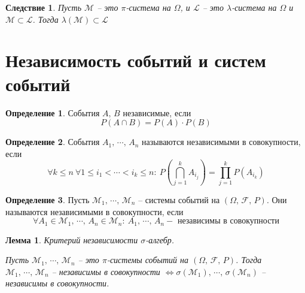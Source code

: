 \documentclass[a4paper,12pt]{article}
\renewcommand{\leq}{\ensuremath{\leqslant}}
\theoremstyle{plain}
\newtheorem{lemma}{Лемма}[section]
\newtheorem*{corollary}{Следствие}
\theoremstyle{definition}
\newtheorem{definition}{Определение}[section]
\theoremstyle{remark}
\begin{document}
\begin{corollary}
	Пусть $\mathcal{M}$ -- это $\pi$-система на $\Omega$, и $\mathcal{L}$ -- это $\lambda$-система на $\Omega$ и $\mathcal{M} \subset \mathcal{L}$. Тогда $\lambda(\mathcal{M}) \subset \mathcal{L}$
\end{corollary}

\section{Независимость событий и систем событий}
\begin{definition}
	События $A,\, B$ независимые, если
	\[P(A \cap B) = P(A) \cdot P(B)\]
\end{definition}

\begin{definition}
	События $A_1,\,\cdots,\,A_n$ называются независимыми в совокупности, если \[\forall k \leq n \: \forall 1 \leq i_1 < \cdots < i_k \leq n :\: P\left(\bigcap_{j = 1}^k A_{i_j}\right) = \prod_{j = 1}^k P(A_{i_k}) \]
\end{definition}

\begin{definition}
	Пусть $\mathcal{M}_1,\,\cdots,\,\mathcal{M}_n$ -- системы событий на $(\Omega,\, \mathcal{F},\, P)$. Они называются независимыми в совокупности, если
	\[\forall A_1 \in \mathcal{M}_1,\, \cdots,\, A_n \in \mathcal{M}_n:\: A_1,\,\cdots,\,A_n - \text{ независимы в совокупности}\]
\end{definition}

\begin{lemma} \label{INDEPENDENCE_CRIT}
	Критерий независимости $\sigma$-алгебр.

	Пусть $\mathcal{M}_1,\,\cdots,\,\mathcal{M}_n$ -- это $\pi$-системы событий на $(\Omega,\, \mathcal{F},\,P)$. Тогда $\mathcal{M}_1,\,\cdots,\,\mathcal{M}_n$ -- независимы в совокупности $\Leftrightarrow \sigma(\mathcal{M}_1),\,\cdots,\,\sigma(\mathcal{M}_n)$ -- независимы в совокупности.
\end{lemma}
\end{document}
